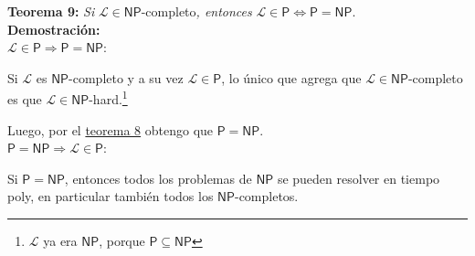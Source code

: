 \documentclass{article}
\begin{document}
\begin{flushleft}
  \textbf{Teorema 9:}
  \textit{Si }$\mathcal{L} \in \mathsf{NP}$-completo\textit{, entonces} $\mathcal{L} \in \mathsf{P} \iff 
  \mathsf{P} = \mathsf{NP}$. \\[0.5em]

  \textbf{\textcolor{Mulberry}{Demostración:}} \\[0.5em]

  \textcolor{Mulberry}{$\mathcal{L} \in \mathsf{P} \Rightarrow \mathsf{P} = \mathsf{NP}$:}

  Si $\mathcal{L}$ es $\mathsf{NP}$-completo y a su vez $\mathcal{L} \in \mathsf{P}$, lo único que agrega 
  que $\mathcal{L} \in \mathsf{NP}$-completo es que $\mathcal{L} \in \mathsf{NP}$-hard.\footnote{
  $\mathcal{L}$ ya era $\mathsf{NP}$, porque $\mathsf{P} \subseteq \mathsf{NP}$}

  Luego, por el \hyperlink{teo8}{\textcolor{Rhodamine}{teorema 8}} obtengo que $\mathsf{P} = \mathsf{NP}$.
  \\[0.5em]

  \textcolor{Mulberry}{$\mathsf{P} = \mathsf{NP} \Rightarrow \mathcal{L} \in \mathsf{P}$:}

  Si $\mathsf{P} = \mathsf{NP}$, entonces todos los problemas de $\mathsf{NP}$ se pueden resolver en tiempo
  poly, en particular también todos los $\mathsf{NP}$-completos.
\end{flushleft}
\end{document}
